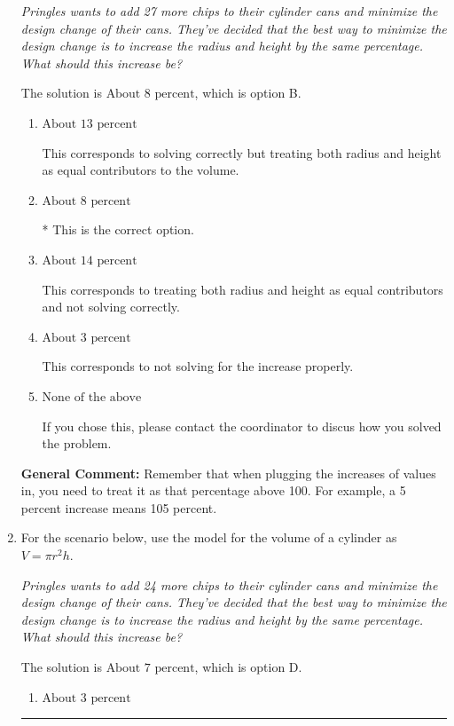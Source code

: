\documentclass{extbook}[14pt]
\newcommand{\litem}[1]{\item #1

\rule{\textwidth}{0.4pt}}
\begin{document}
\begin{enumerate}
{\begin{center}
    \textit{ Pringles wants to add 27  more chips to their cylinder cans and minimize the design change of their cans. They've decided that the best way to minimize the design change is to increase the radius and height by the same percentage. What should this increase be? }
\end{center}
The solution is \( \text{About } 8 \text{ percent} \), which is option B.\begin{enumerate}[label=\Alph*.]
\item \( \text{About } 13 \text{ percent} \)

This corresponds to solving correctly but treating both radius and height as equal contributors to the volume.
\item \( \text{About } 8 \text{ percent} \)

* This is the correct option.
\item \( \text{About } 14 \text{ percent} \)

This corresponds to treating both radius and height as equal contributors and not solving correctly.
\item \( \text{About } 3 \text{ percent} \)

This corresponds to not solving for the increase properly.
\item \( \text{None of the above} \)

If you chose this, please contact the coordinator to discus how you solved the problem.
\end{enumerate}

\textbf{General Comment:} Remember that when plugging the increases of values in, you need to treat it as that percentage above 100. For example, a 5 percent increase means 105 percent.
}
\litem{
For the scenario below, use the model for the volume of a cylinder as $V = \pi r^2 h$.

\begin{center}
    \textit{ Pringles wants to add 24 \text{percent} more chips to their cylinder cans and minimize the design change of their cans. They've decided that the best way to minimize the design change is to increase the radius and height by the same percentage. What should this increase be? }
\end{center}
The solution is \( \text{About } 7 \text{ percent} \), which is option D.\begin{enumerate}[label=\Alph*.]
\item \( \text{About } 3 \text{ percent} \)


\end{enumerate}}
\end{enumerate}
\end{document}
